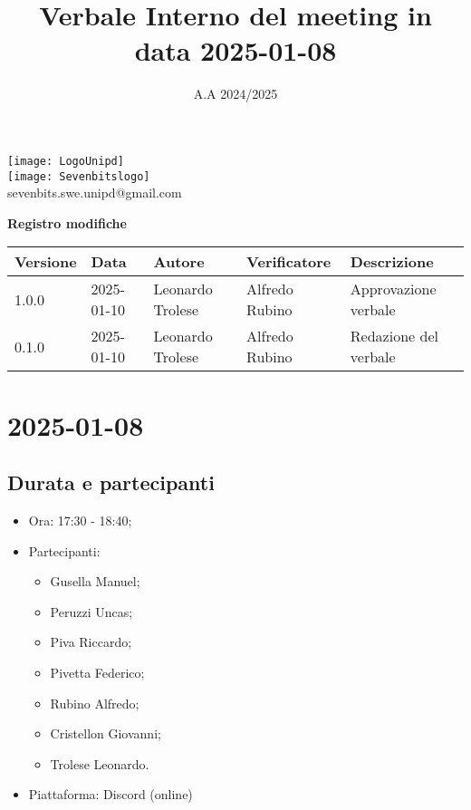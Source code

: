 \documentclass[10pt]{article}
\title{Verbale Interno del meeting in data 2025-01-08}
\date{A.A 2024/2025}
\begin{document}
\maketitle
\begin{center}
\texttt{[image: LogoUnipd]}\\
\texttt{[image: Sevenbitslogo]}\\
sevenbits.swe.unipd@gmail.com\\
\vspace{2mm}

\textbf{Registro modifiche}\\
\vspace{2mm}
\begin{tabularx}{\textwidth}{|l|l|l|l|X|}
\hline
\textbf{Versione} & \textbf{Data} & \textbf{Autore} & \textbf{Verificatore} & \textbf{Descrizione} \\
\hline
1.0.0 & 2025-01-10 & Leonardo Trolese & Alfredo Rubino & Approvazione verbale \\
\hline
0.1.0 & 2025-01-10 & Leonardo Trolese & Alfredo Rubino & Redazione del verbale \\
\hline
\end{tabularx}
\end{center}

\newpage
\tableofcontents
\newpage
\section{2025-01-08}
\subsection{Durata e partecipanti}
\begin{itemize}
\item Ora: 17:30 - 18:40;
\item Partecipanti: 	
	\begin{itemize}
		\item Gusella Manuel;
		\item Peruzzi Uncas;
		\item Piva Riccardo;
		\item Pivetta Federico;
		\item Rubino Alfredo;
		\item Cristellon Giovanni;
		\item Trolese Leonardo.
	\end{itemize}
\item Piattaforma: Discord (online)
\end{itemize}
\end{document}
